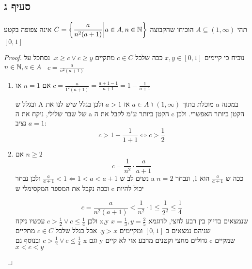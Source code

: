 \documentclass{article}
\begin{document}
 	\subsection*{סעיף ג}
 	תהי $A \subseteq (1, \infty)$ הוכיחו שהקבוצה
 	$C = \bigg\{ \dfrac{a}{n^2(a+1)} \bigg| a \in A, n \in \mathbb{N} \bigg\}$
 	אינה צפופה בקטע $[0,1]$
 	\begin{proof}
 		נוכיח כי קיימים $x, y \in [0,1]$ ככה שלכל $c \in C$ מתקיים $x \geq c \lor c \geq y$.
 		נסתכל על
 		$n \in \mathbb{N}, a \in A$  \ $c = \frac{a}{n^2(a+1)}$
 		\begin{enumerate}[I]
			\item אם $n = 1$ אז
			$c = \frac{a}{1^2(a+1)} = \frac{a + 1 - 1}{a + 1} = 1 - \frac{1}{a+1}$

			ובגלל ש A מוכלת בתוך $(1, \infty)$ ו $a \in A$ אז $a > 1$ ולכן בגלל שיש לנו את a במכנה של שבר שלילי, ניקח את ה a הקטן ביותר ע"מ לקבל את ה c הקטן ביותר האפשרי. ולכן נציב $a = 1$:
			\[ c > 1 - \frac{1}{1+1} \iff c > \frac{1}{2} \]

			\item  אם $n \geq 2$
			\[ c = \frac{1}{n^2} \cdot \frac{a}{a+1} \]
			נשים לב ש
			$\frac{a}{a+1} < 1 \Leftarrow 1 < a < a + 1$
			ולכן נבחר a ככה ש $\frac{a}{a+1}$ הוא 1, ונבחר $n = 2$ וככה נקבל את המספר המקסימלי ש c יכול להיות

			\[ c = \frac{a}{n^2(a+1)} < \frac{1}{n^2} \cdot 1 \leq \frac{1}{2^2} \leq \frac{1}{4} \]
			ולכן
			$c > \frac{1}{2} \lor c \leq \frac{1}{4}$
			עכשיו ניקח x,y שנמצאים בדיוק בין רבע לחצי, לדוגמא
			$x = \frac{1}{3}, y = \frac{2}{5}$
			שניהם נמצאים ב $[0,1]$ ומקיימים $y > x$. אבל בגלל שלכל $c \in C$ מתקיים
			 $c > \frac{1}{2} \lor c \leq \frac{1}{4}$ ובנוסף גם x וגם y גדולים מחצי וקטנים מרבע אזי לא קיים c שמקיים $x < c < y$
		\end{enumerate}
 	\end{proof}
\end{document}
